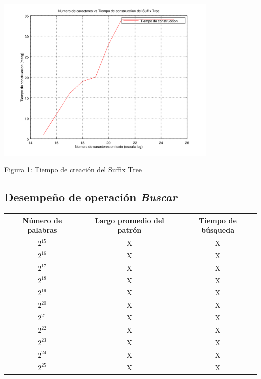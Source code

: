 \documentclass[letterpaper,10pt]{article}
\begin{document}
	\begin{center}
		\includegraphics[width=0.8\textwidth]{fig1.png}

		Figura 1: Tiempo de creación del Suffix Tree
	\end{center}

	\newpage

	\subsection{Desempeño de operación \textit{Buscar}}


	\begin{center}
		\begin{tabular}{|c|c|c|}
			\hline
			Número de palabras & Largo promedio del patrón & Tiempo de búsqueda\\
			\hline
			$2^{15}$ & X & X\\
			\hline
			$2^{16}$ & X & X\\
			\hline
			$2^{17}$ & X & X\\
			\hline
			$2^{18}$ & X & X\\
			\hline
			$2^{19}$ & X & X\\
			\hline
			$2^{20}$ & X & X\\
			\hline
			$2^{21}$ & X & X\\
			\hline
			$2^{22}$ & X & X\\
			\hline
			$2^{23}$ & X & X\\
			\hline
			$2^{24}$ & X & X\\
			\hline
			$2^{25}$ & X & X\\
			\hline
		\end{tabular}
	\end{center}
\end{document}

